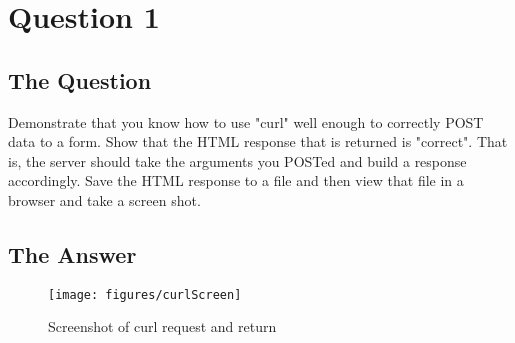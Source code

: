 \section{Question 1}

\subsection{The Question}

Demonstrate that you know how to use "curl" well enough to
correctly POST data to a form.  Show that the HTML response that
is returned is "correct".  That is, the server should take the
arguments you POSTed and build a response accordingly.  Save the
HTML response to a file and then view that file in a browser and
take a screen shot.

\subsection{The Answer}








\begin{figure}
\centering
\texttt{[image: figures/curlScreen]}
\caption{Screenshot of curl request and return}
\end{figure}




